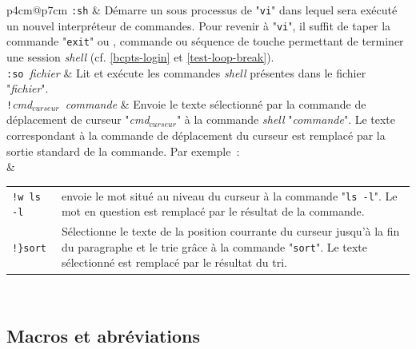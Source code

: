 \begin{longtable}{p{4cm}@{\hspace{0.5cm}}p{7cm}}
	\verb*=:sh=									&
		D{\'e}marre un sous processus de "{\tt vi}" dans lequel sera
		ex{\'e}cut{\'e} un nouvel interpr{\'e}teur de commandes. Pour revenir {\`a}
		"{\tt vi}", il suffit de taper la commande "{\tt exit}"
		ou , commande ou s{\'e}quence de touche permettant
		de terminer une session {\sl shell} (cf. \ref{bcpts-login}
		et \ref{test-loop-break}).
		\\[2ex]
	\verb*=:so ={\sl fichier}						&
		Lit et ex{\'e}cute les commandes {\sl shell} pr{\'e}sentes dans le
		fichier "{\sl fichier}".
		\\[2ex]
	\verb*=!={\sl cmd$_{curseur}$\verb*= =commande}	&
		Envoie le texte s{\'e}lectionn{\'e} par la commande de d{\'e}placement
		de curseur "{\sl cmd$_{curseur}$}" {\`a} la commande {\sl shell}
		"{\sl commande}". Le texte correspondant {\`a} la commande
		de d{\'e}placement du curseur est remplac{\'e} par la sortie standard
		de la commande. Par exemple~:
		\\[2ex]
		&
		\begin{tabular}{l@{\hspace{1ex}}p{5cm}}
			\verb*=!w ls -l={\returnkey} 	&
			envoie le mot situ{\'e} au niveau du curseur {\`a} la commande
			"{\tt ls -l}". Le mot en question est remplac{\'e} par
			le r{\'e}sultat de la commande.
			\\[2ex]
			\verb*=!}sort={\returnkey}		&
			S{\'e}lectionne le texte de la position courrante du curseur
			jusqu'{\`a} la fin du paragraphe et le trie gr{\^a}ce {\`a} la commande
			"{\tt sort}". Le texte s{\'e}lectionn{\'e} est remplac{\'e} par le
			r{\'e}sultat du tri.
		\end{tabular}
		\\[2ex]
\end{longtable}

\subsection{\label{ann-edt-vi-macros}Macros et abr{\'e}viations}

